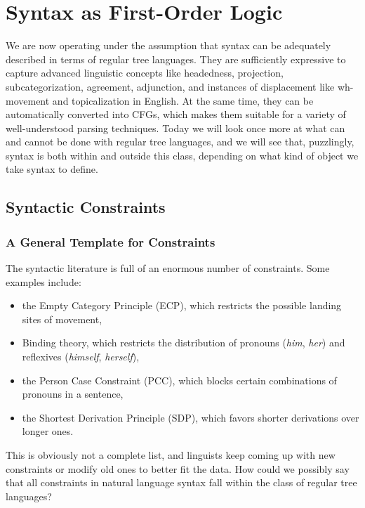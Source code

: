 \chapter{Syntax as First-Order Logic}
\label{cha:FO}

We are now operating under the assumption that syntax can be adequately described in terms of regular tree languages.
They are sufficiently expressive to capture advanced linguistic concepts like headedness, projection, subcategorization, agreement, adjunction, and instances of displacement like wh-movement and topicalization in English.
At the same time, they can be automatically converted into CFGs, which makes them suitable for a variety of well-understood parsing techniques.
Today we will look once more at what can and cannot be done with regular tree languages, and we will see that, puzzlingly, syntax is both within and outside this class, depending on what kind of object we take syntax to define.

\section{Syntactic Constraints}

\subsection{A General Template for Constraints}
The syntactic literature is full of an enormous number of constraints.
Some examples include:
%
\begin{itemize}
    \item the Empty Category Principle (ECP), which restricts the possible landing sites of movement,
    \item Binding theory, which restricts the distribution of pronouns (\emph{him}, \emph{her}) and reflexives (\emph{himself}, \emph{herself}),
    \item the Person Case Constraint (PCC), which blocks certain combinations of pronouns in a sentence,
    \item the Shortest Derivation Principle (SDP), which favors shorter derivations over longer ones.
\end{itemize}
%
This is obviously not a complete list, and linguists keep coming up with new constraints or modify old ones to better fit the data.
How could we possibly say that all constraints in natural language syntax fall within the class of regular tree languages?

